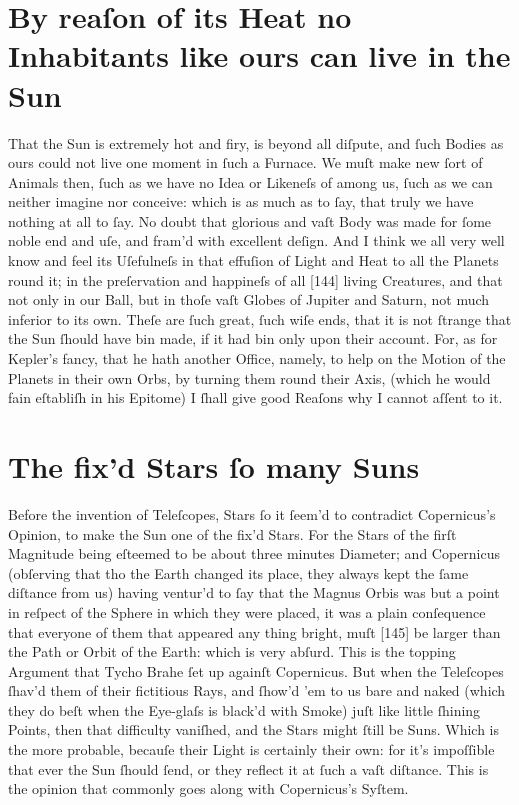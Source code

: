 \documentclass[letterpaper]{book}
\begin{document}
\section{By reaſon of its Heat no Inhabitants like ours can live in the Sun}

That the Sun is extremely hot and firy, is beyond all diſpute, and ſuch
Bodies as ours could not live one moment in ſuch a Furnace. We muſt make new
ſort of Animals then, ſuch as we have no Idea or Likeneſs of among us, ſuch
as we can neither imagine nor conceive: which is as much as to ſay, that
truly we have nothing at all to ſay. No doubt that glorious and vaſt Body
was made for ſome noble end and uſe, and fram'd with excellent deſign.  And I
think we all very well know and feel its Uſefulneſs in that effuſion of
Light and Heat to all the Planets round it; in the preſervation and
happineſs of all [144] living Creatures, and that not only in our Ball, but
in thoſe vaſt Globes of Jupiter and Saturn, not much inferior to its own.
Theſe are ſuch great, ſuch wiſe ends, that it is not ſtrange that the Sun
ſhould have bin made, if it had bin only upon their account. For, as for
Kepler's fancy, that he hath another Office, namely, to help on the Motion
of the Planets in their own Orbs, by turning them round their Axis, (which
he would fain eſtabliſh in his Epitome) I ſhall give good Reaſons why I
cannot aſſent to it.


\section{The fix'd Stars ſo many Suns}

Before the invention of Teleſcopes, Stars ſo it ſeem'd to contradict Copernicus's Opinion, to make the Sun one of the fix'd Stars. For the Stars of
the firſt Magnitude being eſteemed to be about three minutes Diameter; and
Copernicus (obſerving that tho the Earth changed its place, they always kept
the ſame diſtance from us) having ventur'd to ſay that the Magnus Orbis was
but a point in reſpect of the Sphere in which they were placed, it was a
plain conſequence that everyone of them that appeared any thing bright, muſt
[145] be larger than the Path or Orbit of the Earth: which is very abſurd.
This is the topping Argument that Tycho Brahe ſet up againſt Copernicus. But
when the Teleſcopes ſhav'd them of their fictitious Rays, and ſhow'd 'em to
us bare and naked (which they do beſt when the Eye-glaſs is black'd with
Smoke) juſt like little ſhining Points, then that difficulty vaniſhed, and
the Stars might ſtill be Suns. Which is the more probable, becauſe their
Light is certainly their own: for it's impoſſible that ever the Sun ſhould
ſend, or they reflect it at ſuch a vaſt diſtance. This is the opinion that
commonly goes along with Copernicus's Syſtem.
\end{document}
